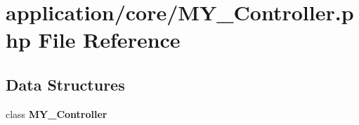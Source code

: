 \section{application/core/\-M\-Y\-\_\-\-Controller.php File Reference}
\label{_m_y___controller_8php}
\subsection*{Data Structures}
\begin{DoxyCompactItemize}
\item 
class {\bf M\-Y\-\_\-\-Controller}
\end{DoxyCompactItemize}
